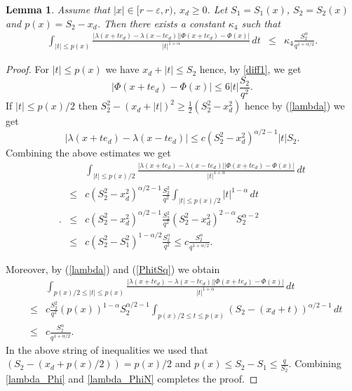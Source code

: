 \documentclass[a4paper,12pt,reqno]{amsart}
\newtheorem{lemma}[theorem]{Lemma}
\theoremstyle{definition}
\theoremstyle{remark}
\newcommand{\eps}{\varepsilon}
\begin{document}
\begin{lemma}
\label{estimates_double1}
Assume that $|x| \in [r - \eps, r)$, $x_d \ge 0$. Let $S_1= S_1(x)$, $S_2= S_2(x)$ and $p(x)=S_2-x_d$. Then there exists a constant $\kappa_4$ such that 
\begin{eqnarray*}
\int_{|t| \le p(x)}
\frac{|\lambda(x + t e_d) - \lambda(x - t e_d)| |\varPhi(x + t e_d) - \varPhi(x) |}{|t|^{1+\alpha}} \, dt 
&\le& \kappa_4 \frac {S^\alpha_2}{q^{1+\alpha/2}}.
\end{eqnarray*}
\end{lemma}
\begin{proof} 
 For  $|t| \le p(x)$ we have $x_d+|t|\le S_2$ hence, by \eqref{diff1}, 
 we get
\begin{equation}
\label{PhitSq}
\left| \varPhi(x + t e_d) - \varPhi(x) \right| 
\le 6 |t| \frac{S_2}{q^{2} }.
\end{equation}
If $|t|\le p(x)/2$ then $S^2_2-(x_d+|t|)^2\ge \frac12( S^2_2-x_d^2)$ hence by (\ref{lambda}) we get
$$\left| \lambda(x + t e_d) - \lambda(x - t e_d) \right| \le 
c (S^2_2-x_d^2)^{\alpha/2-1}|t|S_2.$$
Combining the above estimates we get
\begin{eqnarray}
&&\int_{|t| \le p(x)/2}
\frac{|\lambda(x + t e_d) - \lambda(x - t e_d)| |\varPhi(x + t e_d) - \varPhi(x) |}{|t|^{1+\alpha}} \, dt \nonumber \\
&\le& c (S^2_2-x_d^2)^{\alpha/2-1}\frac {S^2_2}{q^{2}}\int_{|t| \le p(x)/2}|t|^{1-\alpha}\, dt\nonumber\\.
&\le& c (S^2_2-x_d^2)^{\alpha/2-1}\frac {S^2_2}{q^{2}}(S^2_2-x^2_d)^{2-\alpha}S_2^{\alpha-2}\nonumber\\
&\le& c (S^2_2-S_1^2)^{1-\alpha/2}\frac {S^\alpha_2}{q^{2}}
\le c\frac {S^\alpha_2}{q^{1+\alpha/2}}.\label{lambda_Phi}
\end{eqnarray}

Moreover, by (\ref{lambda}) and (\ref{PhitSq}) we obtain
\begin{eqnarray}
&&\int_{ p(x)/2\le |t| \le p(x)}
\frac{|\lambda(x + t e_d) - \lambda(x - t e_d)| |\varPhi(x + t e_d) - \varPhi(x) |}{|t|^{1+\alpha}}  \, dt \nonumber\\
&\le& c \frac {S^2_2}{q^{2}}(p(x))^{1-\alpha}S_2^{\alpha/2-1}\int_{ p(x)/2\le t \le p(x)}  (S_2-(x_d+t))^{\alpha/2-1}\, dt \nonumber\\
&\le& c\frac {S^\alpha_2}{q^{1+\alpha/2}}. \label{lambda_PhiN}
\end{eqnarray}
In the above string of inequalities we used that $(S_2-(x_d+p(x)/2))= p(x)/2$ and  $p(x)\le S_2-S_1\le \frac q{S_2}$. Combining 
\eqref{lambda_Phi} and \eqref{lambda_PhiN} completes the proof. 
\end{proof}
\end{document}
